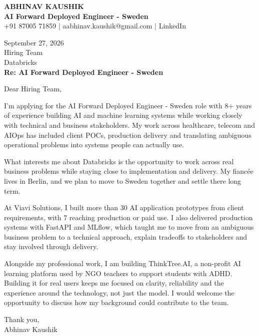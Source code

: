 \documentclass[10pt,a4paper]{article}
\begin{document}
\begin{center}
{\Large\bfseries ABHINAV KAUSHIK}\\[2pt]
{\bfseries AI Forward Deployed Engineer - Sweden}\\[2pt]
+91 87005 71859 \quad | \quad aabhinav.kaushik@gmail.com \quad | \quad LinkedIn
\end{center}
\vspace{8pt}
September 27, 2026\\[6pt]
Hiring Team\\
Databricks\\[4pt]
\textbf{Re: AI Forward Deployed Engineer - Sweden}

Dear Hiring Team,

I’m applying for the AI Forward Deployed Engineer - Sweden role with 8+ years of experience building AI and machine learning systems while working closely with technical and business stakeholders. My work across healthcare, telecom and AIOps has included client POCs, production delivery and translating ambiguous operational problems into systems people can actually use.

What interests me about Databricks is the opportunity to work across real business problems while staying close to implementation and delivery. My fiancée lives in Berlin, and we plan to move to Sweden together and settle there long term.

At Viavi Solutions, I built more than 30 AI application prototypes from client requirements, with 7 reaching production or paid use. I also delivered production systems with FastAPI and MLflow, which taught me to move from an ambiguous business problem to a technical approach, explain tradeoffs to stakeholders and stay involved through delivery.

Alongside my professional work, I am building ThinkTree.AI, a non-profit AI learning platform used by NGO teachers to support students with ADHD. Building it for real users keeps me focused on clarity, reliability and the experience around the technology, not just the model. I would welcome the opportunity to discuss how my background could contribute to the team.

Thank you,\\
Abhinav Kaushik
\end{document}

